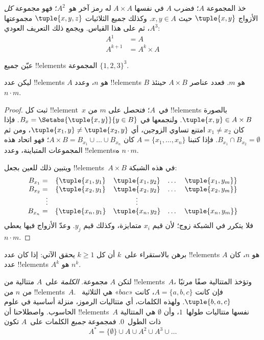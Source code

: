 \documentclass[../../../include/open-logic-section]{subfiles}
\begin{document}
\begin{ex}
خذ المجموعة $A$؛ فضرب $A$ في نفسها $A \times A$ له رمز آخر هو~$A^2$؛
فهو مجموعة \emph{كل} الأزواج $\tuple{x, y}$ حيث $x, y \in A$.
وكذلك جميع الثلاثيات $\tuple{x, y, z}$ مجموعتها $A^3$، ثم على هذا
القياس. ويجمع ذلك التعريف العودي:
\begin{align*}
  A^1 & = A\\
  A^{k+1} & = A^k \times A
\end{align*}
\end{ex}

\begin{prob}
عيّن جميع !!{element}s المجموعة $\{1, 2, 3\}^3$.
\end{prob}

\begin{prop}
ليكن عدد !!{element}s $A$ هو $n$، وعدد !!{element}s $B$ هو $m$.
فعدد عناصر $A \times B$ حينئذ $n\cdot m$.
\end{prop}

\begin{proof}
ثبت كل !!{element}~$x$ في~$A$؛ فتحصل على $m$ من !!{element}s بالصورة
$\tuple{x, y} \in A \times B$. ولنجمعها في
$B_x = \Setabs{\tuple{x, y}}{y \in B}$. فإذا كان
$x_1 \neq x_2$ امتنع تساوي الزوجين، أي $\tuple{x_1, y} \neq \tuple{x_2, y}$،
ومن ثم $B_{x_1} \cap B_{x_2} = \emptyset$. فإذا كتبنا
$A = \{x_1, \dots, x_n\}$ كان
$A \times B = B_{x_1} \cup \dots \cup B_{x_n}$؛ فهو اتحاد هذه
المجموعات المتباينة، وعدد !!{element}sه $n\cdot m$.

ويتبين ذلك للعين بجعل !!{element}s~$A \times B$ في هذه الشبكة:
\[
\begin{array}{rcccc}
  B_{x_1} = & \{\tuple{x_1, y_1} & \tuple{x_1, y_2} & \dots & \tuple{x_1, y_m}\}\\
  B_{x_2} = & \{\tuple{x_2, y_1} & \tuple{x_2, y_2} & \dots & \tuple{x_2, y_m}\}\\
  \vdots & & \vdots\\
  B_{x_n} = & \{\tuple{x_n, y_1} & \tuple{x_n, y_2} & \dots & \tuple{x_n, y_m}\}
\end{array}
\]
فلا يتكرر في الشبكة زوج؛ لأن قيم $x_i$ متمايزة، وكذلك قيم $y_j$.
وعدّ الأزواج فيها يعطي $n\cdot m$.
\end{proof}

\begin{prob}
برهن بالاستقراء على~$k$ أن كل $k \ge 1$ يحقق الآتي: إذا كان عدد
!!{element}s $A$ هو $n$، كان عدد !!{element}s $A^k$ هو $n^k$.
\end{prob}

\begin{ex}
لتكن $A$ مجموعة. \emph{الكلمة} على~$A$ متتالية من !!{element}s~$A$، وتؤخذ
المتتالية صفًا مرتبًا من $n$ من !!{element}s~$A$. فإن كانت
$A = \{a, b, c\}$، كانت «$bac$» هي الثلاثية~$\tuple{b, a, c}$.
ولهذه الكلمات، أي متتاليات الرموز، منزلة أساسية في علوم الحاسوب.
واصطلاحنا أن !!{element}s~$A$ نفسها متتاليات طولها~$1$، وأن
$\emptyset$ هي المتتالية ذات الطول~$0$. فمجموعة \emph{جميع} الكلمات
على~$A$ تكون
\[
A^* = \{\emptyset\} \cup A \cup A^2 \cup A^3 \cup \dots
\]
\end{ex}
\end{document}
